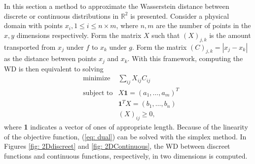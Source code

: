 \documentclass[10pt]{article}
\begin{document}
\noindent In this section a method to approximate the Wasserstein distance between discrete or continuous distributions in $\mathbb{R}^2$ is presented. Consider a physical domain with points $x_{i}, 1 \leq i \leq n \times m$, where $n, m$ are the number of points in the $x, y$ dimensions respectively. Form the matrix $X$ such that $(X)_{j, k}$ is the amount transported from $x_j$ under $f$ to $x_k$ under $g$. Form the matrix $(C)_{j, k} = |x_j - x_k|$ as the distance between points $x_j$ and $x_k.$  With this framework, computing the WD is then equivalent to solving 
\begin{equation}
\begin{aligned}
& {\text{minimize}}
& \sum_{ij}X_{ij}C_{ij} \\
& \text{subject to}
& X\textbf{1} = (a_1, \dotsc, a_m)^{T} \\ 
& & \textbf{1}^{T}X = (b_1, \dotsc, b_n)\\
& & (X)_{ij} \geq 0,
\end{aligned}
\label{eq: dual}
\end{equation}
where \textbf{1} indicates a vector of ones of appropriate length. Because of the linearity of the objective function, (\ref{eq: dual}) can be solved with the simplex method. In Figures \ref{fig: 2Ddiscreet} and \ref{fig: 2DContinuous}, the WD between discreet functions and continuous functions, respectively, in two dimensions is computed.
 
\end{document}
